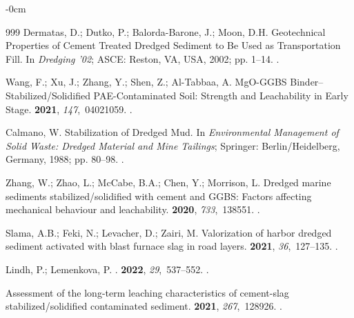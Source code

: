 \documentclass[sustainability,article,accept,pdftex,moreauthors]{Definitions/mdpi}
\begin{document}
{{\begin{adjustwidth}{-\extralength}{0cm}
\begin{thebibliography}{999}
Dermatas, D.; Dutko, P.; Balorda-Barone, J.; Moon, D.H. Geotechnical
  Properties of Cement Treated Dredged Sediment to Be Used as Transportation
  Fill.
\newblock In {\em Dredging '02}; ASCE: Reston, VA, USA, 2002; pp. 1--14.
.

Wang, F.; Xu, J.; Zhang, Y.; Shen, Z.; Al-Tabbaa, A.
\newblock MgO-GGBS Binder–Stabilized/Solidified PAE-Contaminated Soil:
  Strength and Leachability in Early Stage.
 {\bf
  2021}, {\em 147},~04021059.
.

Calmano, W. Stabilization of Dredged Mud.
\newblock In {\em Environmental Management of Solid Waste: Dredged Material and
  Mine Tailings}; Springer:  Berlin/Heidelberg, Germany, 1988; pp.
  80--98.
.

Zhang, W.; Zhao, L.; McCabe, B.A.; Chen, Y.; Morrison, L.
\newblock Dredged marine sediments stabilized/solidified with cement and GGBS:
  Factors affecting mechanical behaviour and leachability.
 {\bf 2020}, {\em 733},~138551.
.

Slama, A.B.; Feki, N.; Levacher, D.; Zairi, M.
\newblock Valorization of harbor dredged sediment activated with blast furnace
  slag in road layers.
 {\bf 2021}, {\em
  36},~127--135.
.

Lindh, P.; Lemenkova, P.
.
 {\bf 2022}, {\em
  29},~537--552.
.

\newblock Assessment of the long-term leaching characteristics of cement-slag
  stabilized/\linebreak solidified contaminated sediment.
 {\bf 2021}, {\em 267},~128926.
.


\end{thebibliography}
\end{adjustwidth}}}
\end{document}
